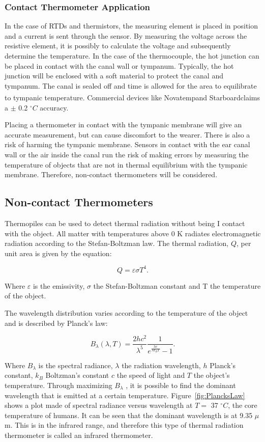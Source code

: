 \subsubsection{Contact Thermometer Application}
In the case of RTDs and thermistors, the measuring element is placed in position and a current is sent through the sensor. By measuring the voltage across the resistive element, it is possibly to calculate the voltage and subsequently determine the temperature. In the case of the thermocouple, the hot junction can be placed in contact with the canal wall or tympanum. Typically, the hot junction will be enclosed with a soft material to protect the canal and tympanum. The canal is sealed off and time is allowed for the area to equilibrate to tympanic temperature. Commercial devices like Novatemp\textsuperscript \textregistered and Starboard\textsuperscript \textregistered claims a $\pm$ 0.2 $^{\circ}C$ accuracy.

\medskip

Placing a thermometer in contact with the tympanic membrane will give an accurate measurement, but can cause discomfort to the wearer. There is also a risk of harming the tympanic membrane. Sensors in contact with the ear canal wall or the air inside the canal run the risk of making errors by measuring the temperature of objects that are not in thermal equilibrium with the tympanic membrane. Therefore, non-contact thermometers will be considered.

\subsection{Non-contact Thermometers}
Thermopiles can be used to detect thermal radiation without being I contact with the object. All matter with temperatures above 0 K radiates electromagnetic radiation according to the Stefan-Boltzman law. The thermal radiation, $Q$, per unit area is given by the equation:

$$Q=\varepsilon \sigma T^4.$$

Where $\varepsilon$ is the emissivity, $\sigma$ the Stefan-Boltzman constant and T the temperature of the object.

The wavelength distribution varies according to the temperature of the object and is described by Planck's law:

$$B_\lambda (\lambda ,T)=\frac{2hc^2}{\lambda ^5}\frac{1}{e^\frac{hc}{\lambda k_B T} -1}.$$
 
Where $B_\lambda$ is the spectral radiance, $\lambda$ the radiation wavelength, $h$ Planck's constant, $k_B$ Boltzman's constant $c$ the speed of light and $T$ the object's temperature. Through maximizing $B_\lambda$ , it is possible to find the dominant wavelength that is emitted at a certain temperature. Figure~\ref{fig:PlancksLaw} shows a plot made of spectral radiance versus wavelength at $T=$ 37 $^{\circ}C$, the core temperature of humans. It can be seen that the dominant wavelength is at 9.35 $\mu$m. This is in the infrared range, and therefore this type of thermal radiation thermometer is called an infrared thermometer.


